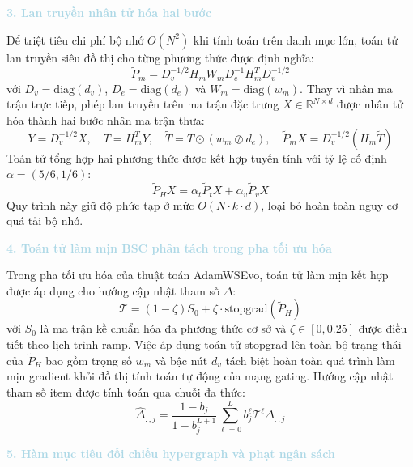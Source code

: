 \noindent\textcolor{lightblue}{\textbf{3. Lan truyền nhân tử hóa hai bước}}

Để triệt tiêu chi phí bộ nhớ $O(N^2)$ khi tính toán trên danh mục lớn, toán tử lan truyền siêu đồ thị cho từng phương thức được định nghĩa:
\begin{equation}
\tilde{P}_m = D_v^{-1/2} H_m W_m D_e^{-1} H_m^T D_v^{-1/2}
\end{equation}
với $D_v = \text{diag}(d_v)$, $D_e = \text{diag}(d_e)$ và $W_m = \text{diag}(w_m)$. Thay vì nhân ma trận trực tiếp, phép lan truyền trên ma trận đặc trưng $X \in \mathbb{R}^{N \times d}$ được nhân tử hóa thành hai bước nhân ma trận thưa:
\begin{equation}
Y = D_v^{-1/2} X, \quad T = H_m^T Y, \quad \tilde{T} = T \odot (w_m \oslash d_e), \quad \tilde{P}_m X = D_v^{-1/2} (H_m \tilde{T})
\end{equation}
Toán tử tổng hợp hai phương thức được kết hợp tuyến tính với tỷ lệ cố định $\alpha = (5/6, 1/6)$:
\begin{equation}
\tilde{P}_H X = \alpha_t \tilde{P}_t X + \alpha_v \tilde{P}_v X
\end{equation}
Quy trình này giữ độ phức tạp ở mức $O(N \cdot k \cdot d)$, loại bỏ hoàn toàn nguy cơ quá tải bộ nhớ.

\noindent\textcolor{lightblue}{\textbf{4. Toán tử làm mịn BSC phân tách trong pha tối ưu hóa}}

Trong pha tối ưu hóa của thuật toán AdamWSEvo, toán tử làm mịn kết hợp được áp dụng cho hướng cập nhật tham số $\Delta$:
\begin{equation}
\mathcal{T} = (1 - \zeta) S_0 + \zeta \cdot \text{stopgrad}(\tilde{P}_H)
\end{equation}
với $S_0$ là ma trận kề chuẩn hóa đa phương thức cơ sở và $\zeta \in [0, 0.25]$ được điều tiết theo lịch trình ramp. Việc áp dụng toán tử stopgrad lên toàn bộ trạng thái của $\tilde{P}_H$ bao gồm trọng số $w_m$ và bậc nút $d_v$ tách biệt hoàn toàn quá trình làm mịn gradient khỏi đồ thị tính toán tự động của mạng gating. Hướng cập nhật tham số item được tính toán qua chuỗi đa thức:
\begin{equation}
\widehat{\Delta}_{:,j} = \frac{1 - b_j}{1 - b_j^{L+1}} \sum_{\ell=0}^{L} b_j^\ell \mathcal{T}^\ell \Delta_{:,j}
\end{equation}

\noindent\textcolor{lightblue}{\textbf{5. Hàm mục tiêu đối chiếu hypergraph và phạt ngân sách}}

